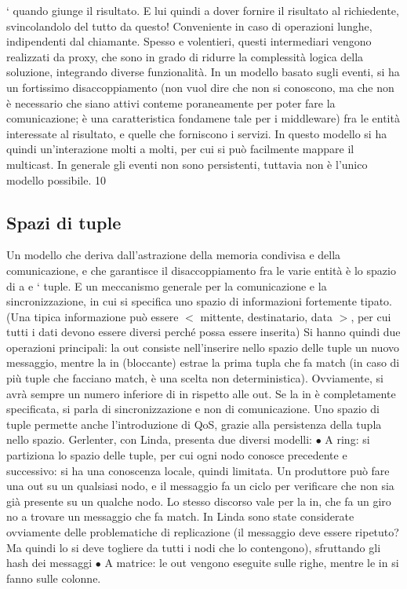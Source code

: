 `
quando giunge il risultato. E lui quindi a dover fornire il risultato al
richiedente, svincolandolo del tutto da questo! Conveniente in caso di
operazioni lunghe, indipendenti dal chiamante.
Spesso e volentieri, questi intermediari vengono realizzati da proxy, che sono in
grado di ridurre la complessità logica della soluzione, integrando diverse funzionalità.
In un modello basato sugli eventi, si ha un fortissimo disaccoppiamento (non
vuol dire che non si conoscono, ma che non è necessario che siano attivi conteme
poraneamente per poter fare la comunicazione; è una caratteristica fondamene
tale per i middleware) fra le entità interessate al risultato, e quelle che forniscono
i servizi. In questo modello si ha quindi un'interazione molti a molti, per cui si
può facilmente mappare il multicast. In generale gli eventi non sono persistenti,
tuttavia non è l'unico modello possibile.
10
\subsection{Spazi di tuple}
Un modello che deriva dall'astrazione della memoria condivisa e della comunicazione, e che garantisce il
disaccoppiamento fra le varie entità è lo spazio di
a e
`
tuple. E un meccanismo generale per la comunicazione e la sincronizzazione, in
cui si specifica uno spazio di informazioni fortemente tipato. (Una tipica informazione può essere $<$ mittente,
destinatario, data $>$, per cui tutti i dati devono
essere diversi perché possa essere inserita)
Si hanno quindi due operazioni principali: la out consiste nell'inserire nello
spazio delle tuple un nuovo messaggio, mentre la in (bloccante) estrae la prima
tupla che fa match (in caso di più tuple che facciano match, è una scelta non
deterministica). Ovviamente, si avrà sempre un numero inferiore di in rispetto
alle out. Se la in è completamente specificata, si parla di sincronizzazione e non
di comunicazione. Uno spazio di tuple permette anche l'introduzione di QoS,
grazie alla persistenza della tupla nello spazio.
Gerlenter, con Linda, presenta due diversi modelli:
$\bullet$ A ring: si partiziona lo spazio delle tuple, per cui ogni nodo conosce
precedente e successivo: si ha una conoscenza locale, quindi limitata. Un
produttore può fare una out su un qualsiasi nodo, e il messaggio fa un
ciclo per verificare che non sia già presente su un qualche nodo. Lo stesso
discorso vale per la in, che fa un giro no a trovare un messaggio che fa
match. In Linda sono state considerate ovviamente delle problematiche
di replicazione (il messaggio deve essere ripetuto? Ma quindi lo si deve
togliere da tutti i nodi che lo contengono), sfruttando gli hash dei messaggi
$\bullet$ A matrice: le out vengono eseguite sulle righe, mentre le in si fanno sulle
colonne.
